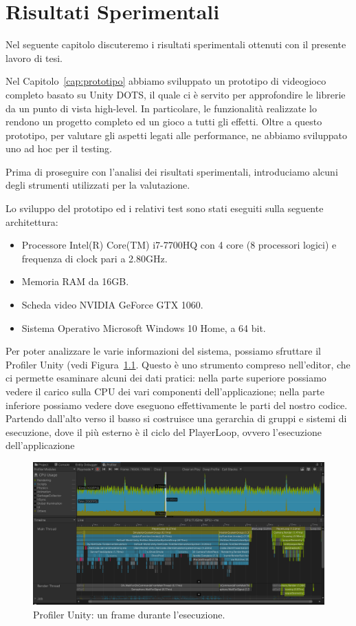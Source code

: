\chapter{Risultati Sperimentali}
\label{cap:risultati}

Nel seguente capitolo discuteremo i risultati sperimentali ottenuti con il presente lavoro di tesi.

Nel Capitolo~\ref{cap:prototipo} abbiamo sviluppato un prototipo di videogioco completo basato su Unity DOTS, il quale ci è servito per approfondire le librerie da un punto di vista high-level. In particolare, le funzionalità realizzate lo rendono un progetto completo ed un gioco a tutti gli effetti. Oltre a questo prototipo, per valutare gli aspetti legati alle performance, ne abbiamo sviluppato uno ad hoc per il testing.

Prima di proseguire con l'analisi dei risultati sperimentali, introduciamo alcuni degli strumenti utilizzati per la valutazione.

Lo sviluppo del prototipo ed i relativi test sono stati eseguiti sulla seguente architettura:
\begin{itemize}
    \item Processore Intel(R) Core(TM) i7-7700HQ con 4 core (8 processori logici) e frequenza di clock pari a 2.80GHz.
    \item Memoria RAM da 16GB.
    \item Scheda video NVIDIA GeForce GTX 1060.
    \item Sistema Operativo Microsoft Windows 10 Home, a 64 bit.
\end{itemize}

Per poter analizzare le varie informazioni del sistema, possiamo sfruttare il Profiler Unity (vedi Figura~\ref{fig:prototipo-profiler}. Questo è uno strumento compreso nell'editor, che ci permette esaminare alcuni dei dati pratici: nella parte superiore possiamo vedere il carico sulla CPU dei vari componenti dell'applicazione; nella parte inferiore possiamo vedere dove eseguono effettivamente le parti del nostro codice. Partendo dall'alto verso il basso si costruisce una gerarchia di gruppi e sistemi di esecuzione, dove il più esterno è il ciclo del PlayerLoop, ovvero l'esecuzione dell'applicazione

\begin{figure}[!ht]
    \centering
    \includegraphics[width=0.95\columnwidth]{gfx/imgs/chapter5/ProfilerPrototipo.png}
    \caption{Profiler Unity: un frame durante l'esecuzione.}
    \label{fig:prototipo-profiler}
\end{figure}


